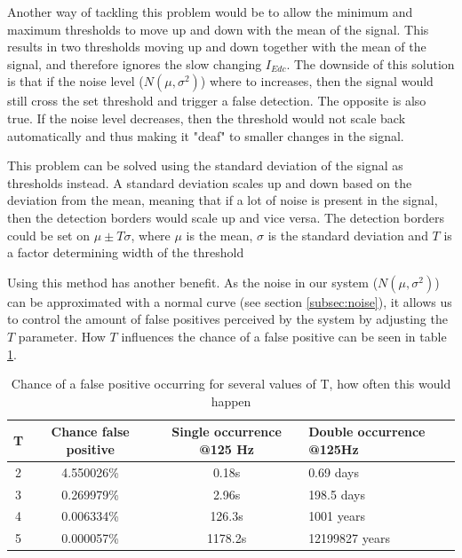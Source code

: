 Another way of tackling this problem would be to allow the minimum and maximum thresholds to move up and down with the mean of the signal. This results in two thresholds moving up and down together with the mean of the signal, and therefore ignores the slow changing $I_{Edc}$. The downside of this solution is that if the noise level ($N(\mu,\sigma^2)$) where to increases, then the signal would still cross the set threshold and trigger a false detection. The opposite is also true. If the noise level decreases, then the threshold would not scale back automatically and thus making it "deaf" to smaller changes in the signal.

This problem can be solved using the standard deviation of the signal as thresholds instead. A standard deviation scales up and down based on the deviation from the mean, meaning that if a lot of noise is present in the signal, then the detection borders would scale up and vice versa. The detection borders could be set on $\mu\pm T\sigma$, where $\mu$ is the mean, $\sigma$ is the standard deviation and $T$ is a factor determining width of the threshold

Using this method has another benefit. As the noise in our system ($N(\mu,\sigma^2)$) can be approximated with a normal curve (see section \ref{subsec:noise}), it allows us to control the amount of false positives perceived by the system by adjusting the $T$ parameter. How $T$ influences the chance of a false positive can be seen in table \ref{tab:Tresholds}.

\begin{table}
	\centering
	\label{tab:Tresholds}
	\begin{tabular}{cccl}
		\hline
		T   & Chance false positive & Single occurrence @125 Hz & Double occurrence @125Hz\\ \hline
		2   & 4.550026\%            & 0.18s                     & 0.69 days               \\
		3   & 0.269979\%            & 2.96s                     & 198.5 days              \\
		4   & 0.006334\%            & 126.3s                    & 1001 years              \\
		5   & 0.000057\%            & 1178.2s                   & 12199827 years          \\ \hline
	\end{tabular}
	\caption{Chance of a false positive occurring for several values of T, how often this would happen}
\end{table}



